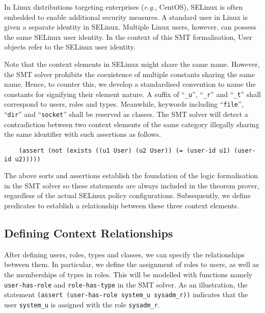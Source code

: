 \documentclass[acmsmall,screen,nonacm]{acmart}
\begin{document}
In Linux distributions targeting enterprises (\textit{e.g.}, CentOS), SELinux 
is often embedded to enable additional security measures. A standard user in 
Linux is given a separate identity in SELinux. Multiple Linux users, however, 
can possess the same SELinux user identity. In the context of this SMT 
formalisation, User objects refer to the SELinux user identity.

Note that the context elements in SELinux might share the same name. However, 
the SMT solver prohibits the coexistence of multiple constants sharing the same 
name. Hence, to counter this, we develop a standardised convention to name the 
constants for signifying their element nature. A suffix of ``\texttt{\_u}'', 
``\texttt{\_r}'' and ``\texttt{\_t}'' shall correspond to users, roles and 
types. Meanwhile, keywords including ``\texttt{file}'', ``\texttt{dir}'' and 
``\texttt{socket}'' shall be reserved as classes. The SMT solver will detect a 
contradiction between two context elements of the same category illegally 
sharing the same identifier with such assertions as follows.
\begin{verbatim}
    (assert (not (exists ((u1 User) (u2 User)) (= (user-id u1) (user-id u2)))))
\end{verbatim}

The above sorts and assertions establish the foundation of the logic 
formalisation in the SMT solver so these statements are always included in the 
theorem prover, regardless of the actual SELinux policy configurations.
Subsequently, we define predicates to establish a relationship between these 
three context elements.

\subsection{Defining Context Relationships}

After defining users, roles, types and classes, we can specify the 
relationships between them. In particular, we define the assignment of roles to 
users, as well as the memberships of types in roles. This will be modelled with 
functions namely \texttt{user-has-role} and \texttt{role-has-type} in the SMT 
solver. As an illustration, the statement \texttt{(assert (user-has-role 
system\_u sysadm\_r))} indicates that the user \texttt{system\_u} is assigned 
with the role \texttt{sysadm\_r}.
\end{document}
